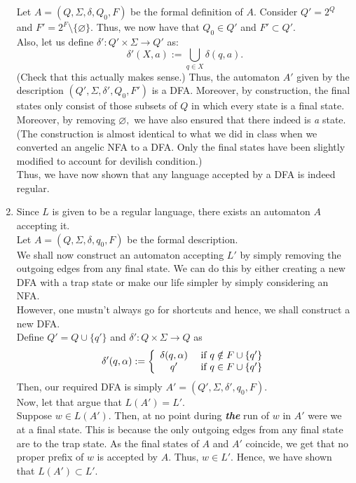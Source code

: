 \documentclass{article}
\let\emptyset\varnothing
\begin{document}
\begin{enumerate}[label = \arabic*.]
	Let $A = (Q, \Sigma, \delta, Q_0, F)$ be the formal definition of $A.$ Consider $Q' = 2^Q$ and $F' = 2^F \setminus \{\emptyset\}.$ Thus, we now have that $Q_0 \in Q'$ and $F' \subset Q'.$\\
	Also, let us define $\delta':Q'\times\Sigma\to Q'$ as:
	\[\delta'(X, a) := \bigcup_{q \in X}\delta(q, a).\]
	(Check that this actually makes sense.)
	Thus, the automaton $A'$ given by the description $(Q', \Sigma, \delta', Q_0, F')$ is a DFA. Moreover, by construction, the final states only consist of those subsets of $Q$ in which every state is a final state. Moreover, by removing $\emptyset,$ we have also ensured that there indeed is \emph{a} state.\\
	(The construction is almost identical to what we did in class when we converted an angelic NFA to a DFA. Only the final states have been slightly modified to account for devilish condition.)\\
	Thus, we have now shown that any language accepted by a DFA is indeed regular.
	\item Since $L$ is given to be a regular language, there exists an automaton $A$ accepting it.\\
	Let $A = (Q, \Sigma, \delta, q_0, F)$ be the formal description.\\
	We shall now construct an automaton accepting $L'$ by simply removing the outgoing edges from any final state. We can do this by either creating a new DFA with a trap state or make our life simpler by simply considering an NFA.\\
	However, one mustn't always go for shortcuts and hence, we shall construct a new DFA.\\
	Define $Q' = Q \cup \{q'\}$ and $\delta':Q\times\Sigma\to Q$ as
	\[\delta'(q, \alpha) :=
	\left\{
		\begin{array}{c l}
			\delta(q, \alpha) & \text{ if }q \notin F\cup\{q'\}\\
			q' & \text{ if } q \in F \cup \{q'\}\\
		\end{array}
	\right.\]
	Then, our required DFA is simply $A' = (Q', \Sigma, \delta', q_0, F).$\\
	Now, let that argue that $L(A') = L'.$\\
	Suppose $w \in L(A').$ Then, at no point during \emph{\textbf{the}} run of $w$ in $A'$ were we at a final state. This is because the only outgoing edges from any final state are to the trap state. As the final states of $A$ and $A'$ coincide, we get that no proper prefix of $w$ is accepted by $A.$ Thus, $w \in L'.$ Hence, we have shown that $L(A') \subset L'.$\\

\end{enumerate}
\end{document}
